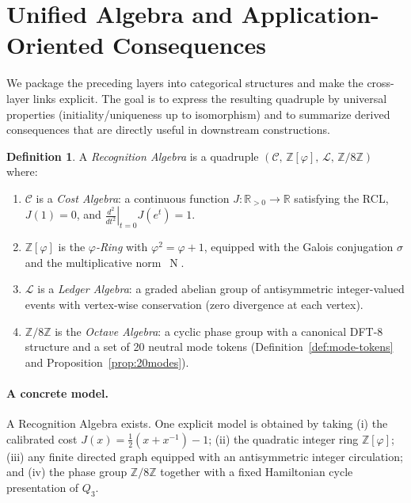 \documentclass[11pt,reqno]{amsart}
\theoremstyle{plain}
\theoremstyle{definition}
\newtheorem{definition}[theorem]{Definition}
\theoremstyle{remark}
\newcommand{\phig}{\varphi}
\newcommand{\Jcost}{J}
\newcommand{\RR}{\mathbb{R}}
\newcommand{\ZZ}{\mathbb{Z}}
\DeclareMathOperator{\Nm}{N} %
\newcommand{\conj}{\sigma} %
\newcommand{\1}{\mathbf{1}}
\begin{document}
\section{Unified Algebra and Application-Oriented Consequences}\label{sec:unified}
We package the preceding layers into categorical structures and make the cross-layer links explicit. The goal is to express the resulting quadruple by universal properties (initiality/uniqueness up to isomorphism) and to summarize derived consequences that are directly useful in downstream constructions. 
\begin{definition}\label{def:rec-alg}
A \emph{Recognition Algebra} is a quadruple
$(\mathcal C,\,\ZZ[\phig],\,\mathcal L,\,\ZZ/8\ZZ)$ where:
\begin{enumerate}[nosep]
\item $\mathcal C$ is a \emph{Cost Algebra}: a continuous function $\Jcost:\RR_{>0}\to\RR$ satisfying the RCL, $\Jcost(1)=0$, and $\left.\frac{d^2}{dt^2}\right|_{t=0}\Jcost(e^t)=1$.
\item $\ZZ[\phig]$ is the \emph{$\phig$-Ring} with $\phig^2=\phig+1$, equipped with the Galois conjugation $\conj$ and the multiplicative norm~$\Nm$.
\item $\mathcal L$ is a \emph{Ledger Algebra}: a graded abelian group of antisymmetric integer-valued events with vertex-wise conservation (zero divergence at each vertex).
\item $\ZZ/8\ZZ$ is the \emph{Octave Algebra}: a cyclic phase group with a canonical DFT-8 structure and a set of 20 neutral mode tokens (Definition~\ref{def:mode-tokens} and Proposition~\ref{prop:20modes}).
\end{enumerate}
\end{definition} 

\paragraph{A concrete model.} A Recognition Algebra exists. One explicit model is obtained by taking (i) the calibrated cost $\Jcost(x)=\tfrac12(x+x^{-1})-1$; (ii) the quadratic integer ring $\ZZ[\phig]$; (iii) any finite directed graph equipped with an antisymmetric integer circulation; and (iv) the phase group $\ZZ/8\ZZ$ together with a fixed Hamiltonian cycle presentation of $Q_3$. 
\end{document}
